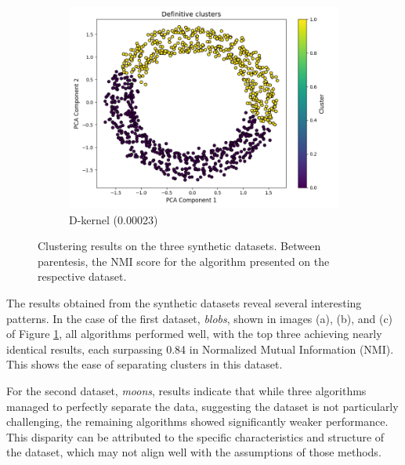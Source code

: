 \documentclass[
	10pt,
	parskip=half-,	
	paper=a4,
	english
	]{scrartcl}
\begin{document}
\begin{figure}[ht]
\begin{subfigure}[b]{0.3\textwidth}
        \includegraphics[width=\textwidth]{../data/plots/synthetic_noise_circles_circles_D-kernel_structural_0.png}
        \caption{D-kernel (0.00023)}
    \end{subfigure}

    \caption{Clustering results on the three synthetic datasets. Between parentesis, the NMI score for the algorithm presented on the respective dataset.}
    \label{fig:synthetic_results_grid}
\end{figure}

The results obtained from the synthetic datasets reveal several interesting patterns. In the case of the first dataset, \textit{blobs}, shown in images (a), (b), and (c) of Figure \ref{fig:synthetic_results_grid}, all algorithms performed well, with the top three achieving nearly identical results, each surpassing 0.84 in Normalized Mutual Information (NMI). This shows the ease of separating clusters in this dataset.

For the second dataset, \textit{moons}, results indicate that while three algorithms managed to perfectly separate the data, suggesting the dataset is not particularly challenging, the remaining algorithms showed significantly weaker performance. This disparity can be attributed to the specific characteristics and structure of the dataset, which may not align well with the assumptions of those methods.
\end{document}
